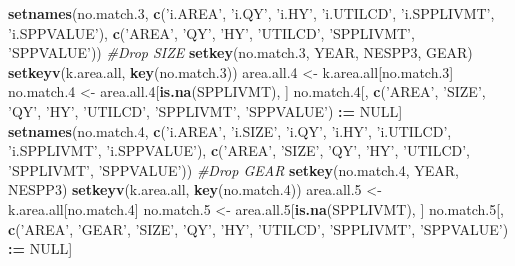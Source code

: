 \documentclass[]{article}
\newenvironment{Shaded}{\begin{snugshade}}{\end{snugshade}}
\newcommand{\KeywordTok}[1]{\textcolor[rgb]{0.13,0.29,0.53}{\textbf{#1}}}
\newcommand{\DecValTok}[1]{\textcolor[rgb]{0.00,0.00,0.81}{#1}}
\newcommand{\StringTok}[1]{\textcolor[rgb]{0.31,0.60,0.02}{#1}}
\newcommand{\CommentTok}[1]{\textcolor[rgb]{0.56,0.35,0.01}{\textit{#1}}}
\newcommand{\OtherTok}[1]{\textcolor[rgb]{0.56,0.35,0.01}{#1}}
\newcommand{\OperatorTok}[1]{\textcolor[rgb]{0.81,0.36,0.00}{\textbf{#1}}}
\newcommand{\ErrorTok}[1]{\textcolor[rgb]{0.64,0.00,0.00}{\textbf{#1}}}
\newcommand{\NormalTok}[1]{#1}
\begin{document}
\begin{Shaded}
\begin{Highlighting}[]
  \KeywordTok{setnames}\NormalTok{(no.match.}\DecValTok{3}\NormalTok{, }\KeywordTok{c}\NormalTok{(}\StringTok{'i.AREA'}\NormalTok{, }\StringTok{'i.QY'}\NormalTok{, }\StringTok{'i.HY'}\NormalTok{, }\StringTok{'i.UTILCD'}\NormalTok{, }\StringTok{'i.SPPLIVMT'}\NormalTok{, }\StringTok{'i.SPPVALUE'}\NormalTok{), }
           \KeywordTok{c}\NormalTok{(}\StringTok{'AREA'}\NormalTok{, }\StringTok{'QY'}\NormalTok{, }\StringTok{'HY'}\NormalTok{, }\StringTok{'UTILCD'}\NormalTok{, }\StringTok{'SPPLIVMT'}\NormalTok{, }\StringTok{'SPPVALUE'}\NormalTok{))}
  \CommentTok{#Drop SIZE}
  \KeywordTok{setkey}\NormalTok{(no.match.}\DecValTok{3}\NormalTok{, YEAR, NESPP3, GEAR)}
  \KeywordTok{setkeyv}\NormalTok{(k.area.all, }\KeywordTok{key}\NormalTok{(no.match.}\DecValTok{3}\NormalTok{))}
\NormalTok{  area.all.}\DecValTok{4}\NormalTok{ <-}\StringTok{ }\NormalTok{k.area.all[no.match.}\DecValTok{3}\NormalTok{]}
\NormalTok{  no.match.}\DecValTok{4}\NormalTok{ <-}\StringTok{ }\NormalTok{area.all.}\DecValTok{4}\NormalTok{[}\KeywordTok{is.na}\NormalTok{(SPPLIVMT), ]}
\NormalTok{  no.match.}\DecValTok{4}\NormalTok{[, }\KeywordTok{c}\NormalTok{(}\StringTok{'AREA'}\NormalTok{, }\StringTok{'SIZE'}\NormalTok{, }\StringTok{'QY'}\NormalTok{, }\StringTok{'HY'}\NormalTok{, }\StringTok{'UTILCD'}\NormalTok{, }\StringTok{'SPPLIVMT'}\NormalTok{, }\StringTok{'SPPVALUE'}\NormalTok{) }\OperatorTok{:}\ErrorTok{=}\StringTok{ }\OtherTok{NULL}\NormalTok{]}
  \KeywordTok{setnames}\NormalTok{(no.match.}\DecValTok{4}\NormalTok{, }\KeywordTok{c}\NormalTok{(}\StringTok{'i.AREA'}\NormalTok{, }\StringTok{'i.SIZE'}\NormalTok{, }\StringTok{'i.QY'}\NormalTok{, }\StringTok{'i.HY'}\NormalTok{, }\StringTok{'i.UTILCD'}\NormalTok{, }\StringTok{'i.SPPLIVMT'}\NormalTok{, }\StringTok{'i.SPPVALUE'}\NormalTok{), }
                       \KeywordTok{c}\NormalTok{(}\StringTok{'AREA'}\NormalTok{,   }\StringTok{'SIZE'}\NormalTok{,   }\StringTok{'QY'}\NormalTok{,   }\StringTok{'HY'}\NormalTok{,  }\StringTok{'UTILCD'}\NormalTok{,  }\StringTok{'SPPLIVMT'}\NormalTok{, }\StringTok{'SPPVALUE'}\NormalTok{))}
  \CommentTok{#Drop GEAR}
  \KeywordTok{setkey}\NormalTok{(no.match.}\DecValTok{4}\NormalTok{, YEAR, NESPP3)}
  \KeywordTok{setkeyv}\NormalTok{(k.area.all, }\KeywordTok{key}\NormalTok{(no.match.}\DecValTok{4}\NormalTok{))}
\NormalTok{  area.all.}\DecValTok{5}\NormalTok{ <-}\StringTok{ }\NormalTok{k.area.all[no.match.}\DecValTok{4}\NormalTok{]}
\NormalTok{  no.match.}\DecValTok{5}\NormalTok{ <-}\StringTok{ }\NormalTok{area.all.}\DecValTok{5}\NormalTok{[}\KeywordTok{is.na}\NormalTok{(SPPLIVMT), ]}
\NormalTok{  no.match.}\DecValTok{5}\NormalTok{[, }\KeywordTok{c}\NormalTok{(}\StringTok{'AREA'}\NormalTok{, }\StringTok{'GEAR'}\NormalTok{, }\StringTok{'SIZE'}\NormalTok{, }\StringTok{'QY'}\NormalTok{, }\StringTok{'HY'}\NormalTok{, }\StringTok{'UTILCD'}\NormalTok{, }\StringTok{'SPPLIVMT'}\NormalTok{, }\StringTok{'SPPVALUE'}\NormalTok{) }\OperatorTok{:}\ErrorTok{=}\StringTok{ }\OtherTok{NULL}\NormalTok{]}

\end{Highlighting}
\end{Shaded}
\end{document}
